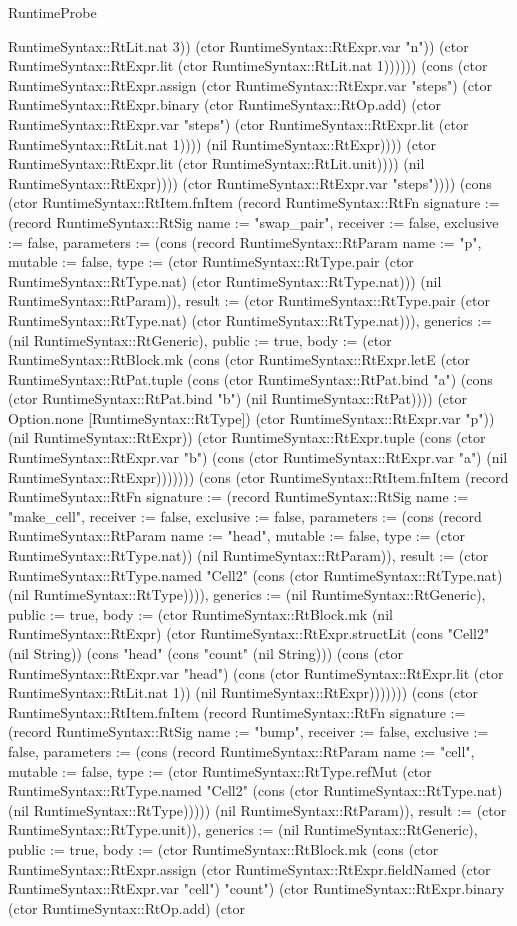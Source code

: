 \begin{lexlean}{RuntimeProbe}
\begin{semanticmodule}
{RuntimeSyntax::RtLit.nat 3)) (ctor RuntimeSyntax::RtExpr.var "n")) (ctor RuntimeSyntax::RtExpr.lit (ctor RuntimeSyntax::RtLit.nat 1)))))) (cons (ctor RuntimeSyntax::RtExpr.assign (ctor RuntimeSyntax::RtExpr.var "steps") (ctor RuntimeSyntax::RtExpr.binary (ctor RuntimeSyntax::RtOp.add) (ctor RuntimeSyntax::RtExpr.var "steps") (ctor RuntimeSyntax::RtExpr.lit (ctor RuntimeSyntax::RtLit.nat 1)))) (nil RuntimeSyntax::RtExpr)))) (ctor RuntimeSyntax::RtExpr.lit (ctor RuntimeSyntax::RtLit.unit)))) (nil RuntimeSyntax::RtExpr)))) (ctor RuntimeSyntax::RtExpr.var "steps"))})) (cons (ctor RuntimeSyntax::RtItem.fnItem (record RuntimeSyntax::RtFn {signature := (record RuntimeSyntax::RtSig {name := "swap_pair", receiver := false, exclusive := false, parameters := (cons (record RuntimeSyntax::RtParam {name := "p", mutable := false, type := (ctor RuntimeSyntax::RtType.pair (ctor RuntimeSyntax::RtType.nat) (ctor RuntimeSyntax::RtType.nat))}) (nil RuntimeSyntax::RtParam)), result := (ctor RuntimeSyntax::RtType.pair (ctor RuntimeSyntax::RtType.nat) (ctor RuntimeSyntax::RtType.nat))}), generics := (nil RuntimeSyntax::RtGeneric), public := true, body := (ctor RuntimeSyntax::RtBlock.mk (cons (ctor RuntimeSyntax::RtExpr.letE (ctor RuntimeSyntax::RtPat.tuple (cons (ctor RuntimeSyntax::RtPat.bind "a") (cons (ctor RuntimeSyntax::RtPat.bind "b") (nil RuntimeSyntax::RtPat)))) (ctor Option.none [RuntimeSyntax::RtType]) (ctor RuntimeSyntax::RtExpr.var "p")) (nil RuntimeSyntax::RtExpr)) (ctor RuntimeSyntax::RtExpr.tuple (cons (ctor RuntimeSyntax::RtExpr.var "b") (cons (ctor RuntimeSyntax::RtExpr.var "a") (nil RuntimeSyntax::RtExpr)))))})) (cons (ctor RuntimeSyntax::RtItem.fnItem (record RuntimeSyntax::RtFn {signature := (record RuntimeSyntax::RtSig {name := "make_cell", receiver := false, exclusive := false, parameters := (cons (record RuntimeSyntax::RtParam {name := "head", mutable := false, type := (ctor RuntimeSyntax::RtType.nat)}) (nil RuntimeSyntax::RtParam)), result := (ctor RuntimeSyntax::RtType.named "Cell2" (cons (ctor RuntimeSyntax::RtType.nat) (nil RuntimeSyntax::RtType)))}), generics := (nil RuntimeSyntax::RtGeneric), public := true, body := (ctor RuntimeSyntax::RtBlock.mk (nil RuntimeSyntax::RtExpr) (ctor RuntimeSyntax::RtExpr.structLit (cons "Cell2" (nil String)) (cons "head" (cons "count" (nil String))) (cons (ctor RuntimeSyntax::RtExpr.var "head") (cons (ctor RuntimeSyntax::RtExpr.lit (ctor RuntimeSyntax::RtLit.nat 1)) (nil RuntimeSyntax::RtExpr)))))})) (cons (ctor RuntimeSyntax::RtItem.fnItem (record RuntimeSyntax::RtFn {signature := (record RuntimeSyntax::RtSig {name := "bump", receiver := false, exclusive := false, parameters := (cons (record RuntimeSyntax::RtParam {name := "cell", mutable := false, type := (ctor RuntimeSyntax::RtType.refMut (ctor RuntimeSyntax::RtType.named "Cell2" (cons (ctor RuntimeSyntax::RtType.nat) (nil RuntimeSyntax::RtType))))}) (nil RuntimeSyntax::RtParam)), result := (ctor RuntimeSyntax::RtType.unit)}), generics := (nil RuntimeSyntax::RtGeneric), public := true, body := (ctor RuntimeSyntax::RtBlock.mk (cons (ctor RuntimeSyntax::RtExpr.assign (ctor RuntimeSyntax::RtExpr.fieldNamed (ctor RuntimeSyntax::RtExpr.var "cell") "count") (ctor RuntimeSyntax::RtExpr.binary (ctor RuntimeSyntax::RtOp.add) (ctor }
\end{semanticmodule}
\end{lexlean}
